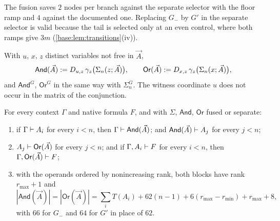 The fusion saves $2$ nodes per branch against the separate selector with the
floor ramp and $4$ against the documented one.  Replacing $G_-$ by $G'$ in
the separate selector is valid because the tail is selected only at an even
control, where both ramps give $3m$ (\cref{base:lem:transitions}(iv)).

\begin{definition}
\label{base:def:blocks}
With $u$, $x$, $z$ distinct variables not free in $\vec A$,
\[
 \mathsf{And}(\vec A)\mathrel{:=}D_{u,z}\,\gamma_z\bigl(\Sigma_n(z;\vec A)\bigr),\qquad
 \mathsf{Or}(\vec A)\mathrel{:=}D_{x,z}\,\gamma_z\bigl(\Sigma_n(x;\vec A)\bigr),
\]
and $\mathsf{And}^{G}$, $\mathsf{Or}^{G}$ in the same way with $\Sigma^{G}_n$.
The witness coordinate $u$ does not occur in the matrix of the conjunction.
\end{definition}

\begin{theorem}
\label{base:thm:blocks}
For every context $\Gamma$ and native formula $F$, and with $\Sigma$, $\mathsf{And}$,
$\mathsf{Or}$ fused or separate:
\begin{enumerate}[label=\textup{(\roman*)}]
\item if $\Gamma\vdash A_i$ for every $i<n$, then
 $\Gamma\vdash\mathsf{And}(\vec A)$; and
 $\mathsf{And}(\vec A)\vdash A_j$ for every $j<n$;
\item $A_j\vdash\mathsf{Or}(\vec A)$ for every $j<n$; and if
 $\Gamma,A_i\vdash F$ for every $i<n$, then
 $\Gamma,\mathsf{Or}(\vec A)\vdash F$;
\item with the operands ordered by nonincreasing rank, both blocks have rank
 $r_{\max}+1$ and
 \[
  |\mathsf{And}(\vec A)|=|\mathsf{Or}(\vec A)|
  =\textstyle\sum_iT(A_i)+62(n-1)+6(r_{\max}-r_{\min})+r_{\max}+8,
 \]
 with $66$ for $G_-$ and $64$ for $G'$ in place of $62$.
\end{enumerate}
\end{theorem}

